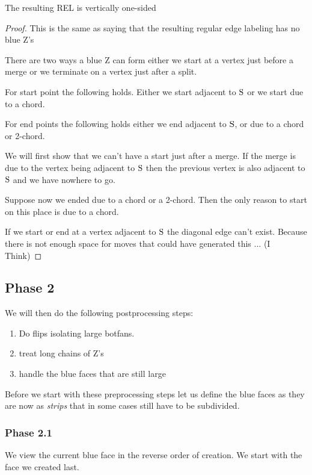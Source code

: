       \begin{lemma}
        \label{lm:}
        The resulting REL is vertically one-sided
      \end{lemma}
      \begin{proof}
        This is the same as saying that the resulting regular edge labeling has no blue Z's

        There are two ways a blue Z can form either we start at a vertex just before a merge or we terminate on a vertex just after a split.

        For start point the following holds. Either we start adjacent to $\mathrm{S}$ or we start due to a chord.

        For end points the following holds either we end adjacent to $\mathrm{S}$, or due to a chord or 2-chord.


        We will first show that we can't have a start just after a merge.
        If the merge is due to the vertex being adjacent to $\mathrm{S}$ then the previous vertex is also adjacent to $\mathrm{S}$ and we have nowhere to go. 

        Suppose now we ended due to a chord or a 2-chord. Then the only reason to start on this place is due to a chord.

        If we start or end at a vertex adjacent to $\mathrm{S}$ the diagonal edge can't exist. Because there is not enough space for moves that could have generated this ... (I Think)



      \end{proof}

\subsection{Phase 2}
  We will then do the following postprocessing steps:

  \begin{enumerate}
    \item Do flips isolating large botfans.
    \item treat long chains of Z's
    \item handle the blue faces that are still large
  \end{enumerate}

  Before we start with these preprocessing steps let us define the blue faces as they are now as \emph{strips} that in some cases still have to be subdivided.

  \subsubsection{Phase 2.1}
    We view the current blue face in the reverse order of creation. We start with the face we created last.

